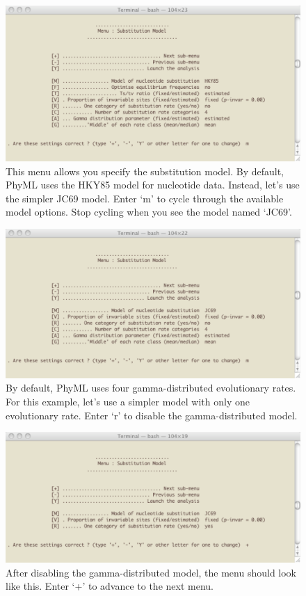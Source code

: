 \documentclass[11pt]{article}
\begin{document}
\begin{figure}[ph]
\centering
\includegraphics[width=5.5 in]{GRAPHICS/a8.pdf}
\caption{This menu allows you specify the substitution model.  By default, PhyML uses the HKY85 model for nucleotide data.  Instead, let's use the simpler JC69 model.  Enter `m' to cycle through the available model options.  Stop cycling when you see the model named `JC69'.}
\end{figure}
\clearpage

\begin{figure}[p]
\centering
\includegraphics[width=5.5 in]{GRAPHICS/a9.pdf}
\caption{By default, PhyML uses four gamma-distributed evolutionary rates.  For this example, let's use a simpler model with only one evolutionary rate.  Enter `r' to disable the gamma-distributed model.}
\end{figure}
\clearpage

\begin{figure}[p]
\centering
\includegraphics[width=5.5 in]{GRAPHICS/a10.pdf}
\caption{After disabling the gamma-distributed model, the menu should look like this.  Enter `+' to advance to the next menu.}
\end{figure}
\clearpage
\end{document}

